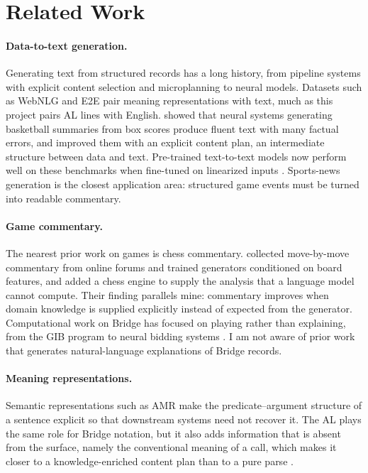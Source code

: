 \documentclass[11pt]{article}
\begin{document}
\section{Related Work}

\paragraph{Data-to-text generation.} Generating text from structured records has a long history, from pipeline systems with explicit content selection and microplanning \citep{reiter2000building} to neural models. Datasets such as WebNLG \citep{gardent2017webnlg} and E2E \citep{novikova2017e2e} pair meaning representations with text, much as this project pairs AL lines with English. \citet{wiseman2017challenges} showed that neural systems generating basketball summaries from box scores produce fluent text with many factual errors, and \citet{puduppully2019content} improved them with an explicit content plan, an intermediate structure between data and text. Pre-trained text-to-text models now perform well on these benchmarks when fine-tuned on linearized inputs \citep{kale2020text}. Sports-news generation \citep{kanerva2019template} is the closest application area: structured game events must be turned into readable commentary.

\paragraph{Game commentary.} The nearest prior work on games is chess commentary. \citet{jhamtani2018chess} collected move-by-move commentary from online forums and trained generators conditioned on board features, and \citet{zang2019chess} added a chess engine to supply the analysis that a language model cannot compute. Their finding parallels mine: commentary improves when domain knowledge is supplied explicitly instead of expected from the generator. Computational work on Bridge has focused on playing rather than explaining, from the GIB program \citep{ginsberg2001gib} to neural bidding systems \citep{yeh2016bridge,rong2019bridge}. I am not aware of prior work that generates natural-language explanations of Bridge records.

\paragraph{Meaning representations.} Semantic representations such as AMR \citep{banarescu2013amr} make the predicate--argument structure of a sentence explicit so that downstream systems need not recover it. The AL plays the same role for Bridge notation, but it also adds information that is absent from the surface, namely the conventional meaning of a call, which makes it closer to a knowledge-enriched content plan than to a pure parse \citep{jurafsky2025slp3}.
\end{document}
